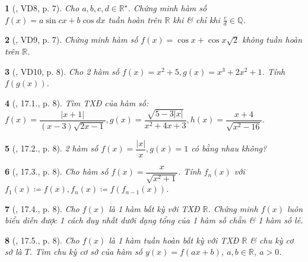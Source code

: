 \documentclass{article}
\newtheorem{baitoan}{}
\begin{document}
\begin{baitoan}[\cite{Hai_Hung_Thu_Tung_ncpt_Toan_10_tap_2}, VD8, p. 7]
	Cho $a,b,c,d\in\mathbb{R}^\star$. Chứng minh hàm số $f(x) = a\sin cx + b\cos dx$ tuần hoàn trên $\mathbb{R}$ khi \& chỉ khi $\frac{c}{d}\in\mathbb{Q}$.
\end{baitoan}

\begin{baitoan}[\cite{Hai_Hung_Thu_Tung_ncpt_Toan_10_tap_2}, VD9, p. 7]
	Chứng minh hàm số $f(x) = \cos x + \cos x\sqrt{2}$ không tuần hoàn trên $\mathbb{R}$.
\end{baitoan}

\begin{baitoan}[\cite{Hai_Hung_Thu_Tung_ncpt_Toan_10_tap_2}, VD10, p. 8]
	Cho 2 hàm số $f(x) = x^2 + 5,g(x) = x^3 + 2x^2 + 1$. Tính $f(g(x))$.
\end{baitoan}

\begin{baitoan}[\cite{Hai_Hung_Thu_Tung_ncpt_Toan_10_tap_2}, 17.1., p. 8]
	Tìm {\rm TXĐ} của hàm số: $f(x) = \dfrac{|x + 1|}{(x - 3)\sqrt{2x - 1}},g(x) = \dfrac{\sqrt{5 - 3|x|}}{x^2 + 4x + 3},h(x) = \dfrac{x + 4}{\sqrt{x^2 - 16}}$.
\end{baitoan}

\begin{baitoan}[\cite{Hai_Hung_Thu_Tung_ncpt_Toan_10_tap_2}, 17.2., p. 8]
	2 hàm số $f(x) = \dfrac{|x|}{x},g(x) = 1$ có bằng nhau không?
\end{baitoan}

\begin{baitoan}[\cite{Hai_Hung_Thu_Tung_ncpt_Toan_10_tap_2}, 17.3., p. 8]
	Cho hàm số $f(x) = \dfrac{x}{\sqrt{x^2 + 1}}$. Tính $f_n(x)$ với $f_1(x)\coloneqq f(x),f_n(x)\coloneqq f(f_{n-1}(x))$.
\end{baitoan}

\begin{baitoan}[\cite{Hai_Hung_Thu_Tung_ncpt_Toan_10_tap_2}, 17.4., p. 8]
	Cho $f(x)$ là 1 hàm bất kỳ với {\rm TXĐ} $\mathbb{R}$. Chứng minh $f(x)$ luôn biểu diễn được 1 cách duy nhất dưới dạng tổng của 1 hàm số chẵn \& 1 hàm số lẻ.
\end{baitoan}

\begin{baitoan}[\cite{Hai_Hung_Thu_Tung_ncpt_Toan_10_tap_2}, 17.5., p. 8]
	Cho $f(x)$ là 1 hàm tuần hoàn bất kỳ với {\rm TXĐ} $\mathbb{R}$ \& chu kỳ cơ sở là $T$. Tìm chu kỳ cơ sở của hàm số $y(x) = f(ax + b)$, $a,b\in\mathbb{R}$, $a > 0$.
\end{baitoan}
\end{document}
